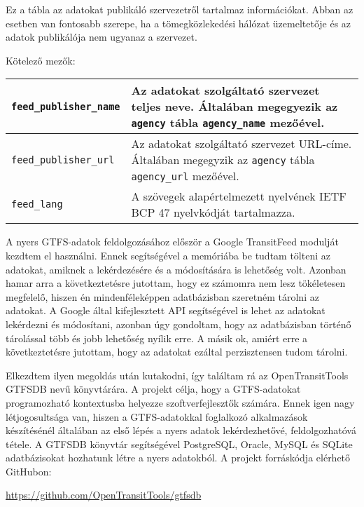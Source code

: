 
Ez a tábla az adatokat publikáló szervezetről tartalmaz információkat. Abban az esetben van fontosabb szerepe, ha a tömegközlekedési hálózat üzemeltetője és az adatok publikálója nem ugyanaz a szervezet.

\medskip

\noindent Kötelező mezők:

\bigskip

\begin{tabular}{|p{4cm}|p{9cm}|}
\hline
\texttt{feed\_publisher\_name} & Az adatokat szolgáltató szervezet teljes neve. Általában megegyezik az \texttt{agency} tábla \texttt{agency\_name} mezőével. \\
\hline
\texttt{feed\_publisher\_url} & Az adatokat szolgáltató szervezet URL-címe. Általában megegyzik az \texttt{agency} tábla \texttt{agency\_url} mezőével. \\
\hline
\texttt{feed\_lang} & A szövegek alapértelmezett nyelvének IETF BCP 47 nyelvkódját tartalmazza. \\
\hline
\end{tabular}


A nyers GTFS-adatok feldolgozásához először a Google TransitFeed modulját kezdtem el használni. Ennek segítségével a memóriába be tudtam tölteni az adatokat, amiknek a lekérdezésére és a módosítására is lehetőség volt. Azonban hamar arra a következtetésre jutottam, hogy ez számomra nem lesz tökéletesen megfelelő, hiszen én mindenféleképpen adatbázisban szeretném tárolni az adatokat. A Google által kifejlesztett API segítségével is lehet az adatokat lekérdezni és módosítani, azonban úgy gondoltam, hogy az adatbázisban történő tárolással több és jobb lehetőség nyílik erre. A másik ok, amiért erre a következtetésre jutottam, hogy az adatokat ezáltal perzisztensen tudom tárolni.

Elkezdtem ilyen megoldás után kutakodni, így találtam rá az OpenTransitTools GTFSDB nevű könyvtárára. A projekt célja, hogy a GTFS-adatokat programozható kontextusba helyezze szoftverfejlesztők számára. Ennek igen nagy létjogosultsága van, hiszen a GTFS-adatokkal foglalkozó alkalmazások készítésénél általában az első lépés a nyers adatok lekérdezhetővé, feldolgozhatóvá tétele. A GTFSDB könyvtár segítségével PostgreSQL, Oracle, MySQL és SQLite adatbázisokat hozhatunk létre a nyers adatokból. A projekt forráskódja elérhető GitHubon:

\begin{center}
\url{https://github.com/OpenTransitTools/gtfsdb}
\end{center}

